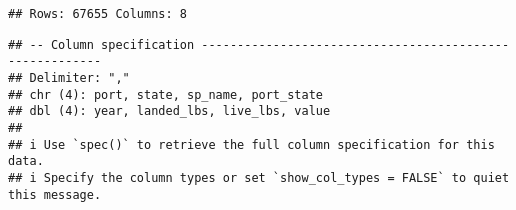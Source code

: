 \documentclass[
]{article}
\newenvironment{Shaded}{\begin{snugshade}}{\end{snugshade}}
\newcommand{\AttributeTok}[1]{\textcolor[rgb]{0.77,0.63,0.00}{#1}}
\newcommand{\CommentTok}[1]{\textcolor[rgb]{0.56,0.35,0.01}{\textit{#1}}}
\newcommand{\DecValTok}[1]{\textcolor[rgb]{0.00,0.00,0.81}{#1}}
\newcommand{\FunctionTok}[1]{\textcolor[rgb]{0.00,0.00,0.00}{#1}}
\newcommand{\NormalTok}[1]{#1}
\newcommand{\OtherTok}[1]{\textcolor[rgb]{0.56,0.35,0.01}{#1}}
\newcommand{\SpecialCharTok}[1]{\textcolor[rgb]{0.00,0.00,0.00}{#1}}
\begin{document}
\begin{verbatim}
## Rows: 67655 Columns: 8
\end{verbatim}

\begin{verbatim}
## -- Column specification --------------------------------------------------------
## Delimiter: ","
## chr (4): port, state, sp_name, port_state
## dbl (4): year, landed_lbs, live_lbs, value
## 
## i Use `spec()` to retrieve the full column specification for this data.
## i Specify the column types or set `show_col_types = FALSE` to quiet this message.
\end{verbatim}

\begin{Shaded}
\end{Shaded}
\end{document}
